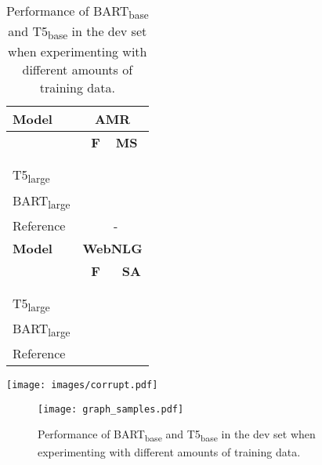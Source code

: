 \documentclass[11pt]{article}
\newcommand{\sep}{}
\begin{document}
\begin{table}[t]
\begin{table}[t]
\centering
{\renewcommand{\arraystretch}{0.9}
\begin{tabular}{lll} 
\toprule
\textbf{Model} & \multicolumn{2}{c}{\textbf{AMR}}  \\
\midrule
& \, \,\textbf{F} & \,\textbf{MS} \\
\midrule
\citet{mager2020gpttoo} &&  \\
\citet{harkous2020text} &&  \\
T5\textsubscript{large} &&  \\
BART\textsubscript{large} &&  \\
Reference && - \\
\midrule
\textbf{Model} & \multicolumn{2}{c}{\textbf{WebNLG}}  \\
 \midrule
& \, \,\textbf{F} & \, \,\textbf{SA} \\
\midrule
 \citet{castro-ferreira-etal-2019-neural} &&  \\
 \citet{harkous2020text} &&  \\
 T5\textsubscript{large} &&  \\
BART\textsubscript{large} &&  \\
Reference &&  \\
\bottomrule
\end{tabular}}
\caption{Fluency (F), Meaning Similarity (MS) and Semantic Adequacy (SA) obtained in the human evaluation. Differences between models which have a letter in common are not statistically significant and were determined by pairwise Mann-Whitney tests with .}
\label{tab:humanevevaluation}
\vspace{-0.3cm}
\end{table}

 \begin{figure*}[t]
    \centering
    \texttt{[image: images/corrupt.pdf]}
    \caption{Example graph with 5 triples, from WebNLG dev linearized with the neutral separator tag, denoted \sep{}, (top left), its shuffled version (top right), texts generated with two fine-tuned versions of T5\textsubscript{small} and a gold reference (bottom). Note that T5 can produce a reasonable text even when the input triples are shuffled randomly.}
    \label{fig:graphs-shuffle}
\end{figure*}

 \begin{figure}[t]
    \centering
    \texttt{[image: graph\_samples.pdf]}
    \caption{Performance of BART\textsubscript{base} and T5\textsubscript{base} in the dev set when experimenting with different amounts of training data.}
    \label{fig:graphs-trainingexamples}
    \vspace{-3mm}
\end{figure}


\end{table}
\end{document}
